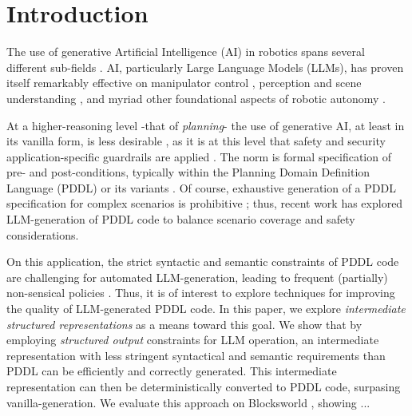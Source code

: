 \documentclass[acmlarge]{acmart}
\begin{document}



\maketitle

\section{Introduction}
\label{sec:introduction}

The use of generative Artificial Intelligence (AI) in robotics spans several different sub-fields \cite{zhang2025generative}. AI, particularly Large Language Models (LLMs), has proven itself remarkably effective on manipulator control \cite{rawat2023intelligent}, perception and scene understanding \cite{mascaro2025scene}, and myriad other foundational aspects of robotic autonomy \cite{kunze2018artificial}.
\par At a higher-reasoning level -that of \textit{planning}- the use of generative AI, at least in its vanilla form, is less desirable \cite{klassen2022ai}, as it is at this level that safety and security application-specific guardrails are applied \cite{ravichandran2026safety}. The norm is formal specification of pre- and post-conditions, typically within the Planning Domain Definition Language (PDDL) or its variants \cite{kootbally2015towards}. Of course, exhaustive generation of a PDDL specification for complex scenarios is prohibitive \cite{chu2025llm+}; thus, recent work \cite{capitanelli2024framework,smirnov2024generating,helmert2009concise,vyasgeneral,vyas2025extensive,liunatural} has explored LLM-generation of PDDL code to balance scenario coverage and safety considerations.
\par On this application, the strict syntactic and semantic constraints of PDDL code are challenging for automated LLM-generation, leading to frequent (partially) non-sensical policies \cite{chen2025language}. Thus, it is of interest to explore techniques for improving the quality of LLM-generated PDDL code. In this paper, we explore \textit{intermediate structured representations} as a means toward this goal. We show that by employing \textit{structured output} constraints for LLM operation, an intermediate representation with less stringent syntactical and semantic requirements than PDDL can be efficiently and correctly generated. This intermediate representation can then be deterministically converted to PDDL code, surpasing vanilla-generation. We evaluate this approach on Blocksworld \cite{bird}, showing ... 
\end{document}
